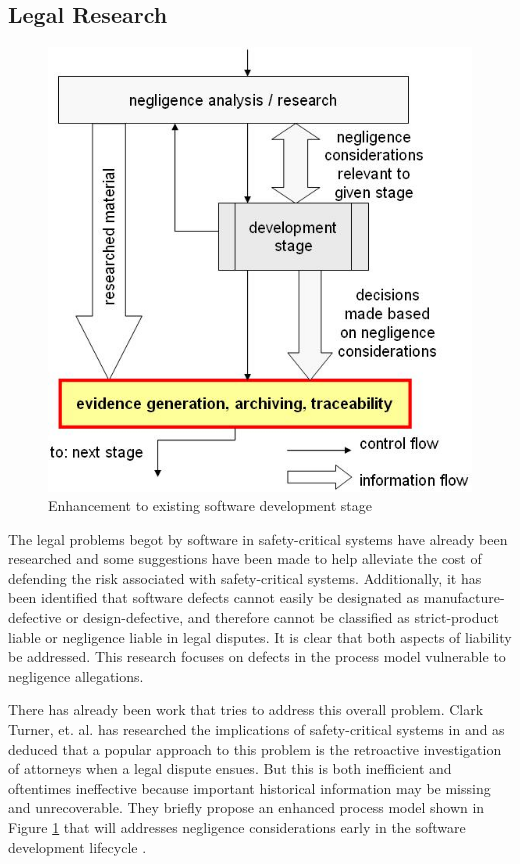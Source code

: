 \subsection{Legal Research}
\begin{figure}
\begin{center}
\includegraphics[scale=0.66]{images/enhancement.jpg}
\end{center}
\caption{Enhancement to existing software development stage}
\label{enhancement}
\end{figure}
The legal problems begot by software in safety-critical systems have already
been researched \cite{Turner1996, Turner2000} and some suggestions have been
made to help alleviate the cost of defending the risk associated with
safety-critical systems\cite{Turner2001}. Additionally, it has been identified
that software defects cannot easily be designated as manufacture-defective or
design-defective\cite{Turner2000}, and therefore cannot be classified as
strict-product liable or negligence liable in legal disputes. It is clear that
both aspects of liability be addressed. This research focuses on defects in the
process model vulnerable to negligence allegations.

There has already been work that tries to address this overall problem. Clark
Turner, et. al. has researched the implications of safety-critical systems in
\cite{Turner1996, Turner2000, Turner2001} and as deduced that a popular
approach to this problem is the retroactive investigation of attorneys when a
legal dispute ensues. But this is both inefficient and oftentimes ineffective
because important historical information may be missing and unrecoverable. They
briefly propose an enhanced process model shown in Figure \ref{enhancement} that
will addresses negligence considerations early in the software development
lifecycle \cite{Turner2001}.

